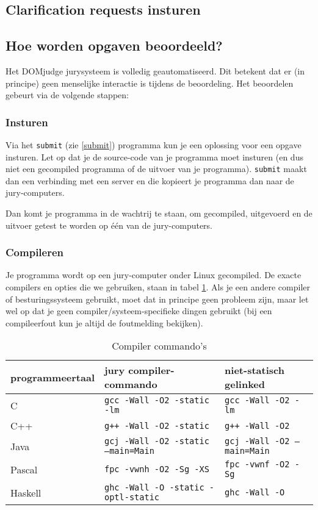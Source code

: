 \documentclass[11pt,titlepage,a4paper]{article}
\newcommand{\DOMjudge}{DOMjudge }
\begin{document}
\subsection{Clarification requests insturen}


\subsection{Hoe worden opgaven beoordeeld?}

Het \DOMjudge jurysysteem is volledig geautomatiseerd. Dit betekent
dat er (in principe) geen menselijke interactie is tijdens de
beoordeling. Het beoordelen gebeurt via de volgende stappen:

\subsubsection{Insturen}

Via het \texttt{submit} (zie \ref{submit}) programma kun je een
oplossing voor een opgave insturen. Let op dat je de source-code van
je programma moet insturen (en dus niet een gecompiled programma of de
uitvoer van je programma). \texttt{submit} maakt dan een verbinding
met een server en die kopieert je programma dan naar de
jury-computers.

Dan komt je programma in de wachtrij te staan, om gecompiled,
uitgevoerd en de uitvoer getest te worden op \'e\'en van de
jury-computers.

\subsubsection{Compileren}

Je programma wordt op een jury-computer onder Linux gecompiled. De
exacte compilers en opties die we gebruiken, staan in tabel
\ref{compilercommandos}. Als je een andere compiler of besturingssysteem
gebruikt, moet dat in principe geen probleem zijn, maar let wel op dat
je geen compiler/systeem-specifieke dingen gebruikt (bij een
compileerfout kun je altijd de foutmelding bekijken).

\begin{table}[!ht]
\caption{Compiler commando's}
\begin{tabular}{|l|l|l|}
\hline
programmeertaal & jury compiler-commando & niet-statisch gelinked \\
\hline
C       & \texttt{gcc -Wall -O2 -static -lm}         & \texttt{gcc -Wall -O2 -lm} \\
C++     & \texttt{g++ -Wall -O2 -static}             & \texttt{g++ -Wall -O2} \\
Java    & \texttt{gcj -Wall -O2 -static --main=Main} & \texttt{gcj -Wall -O2 --main=Main} \\
Pascal  & \texttt{fpc -vwnh -O2 -Sg -XS}             & \texttt{fpc -vwnf -O2 -Sg} \\
Haskell & \texttt{ghc -Wall -O -static -optl-static} & \texttt{ghc -Wall -O} \\
\hline
\end{tabular}
\label{compilercommandos}
\end{table}
\end{document}
